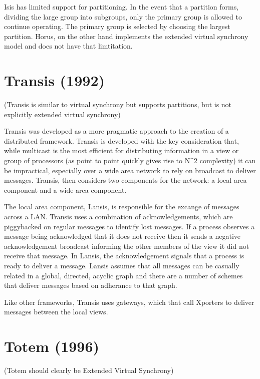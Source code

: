 Isis has limited support for partitioning. In the event that
a partition forms, dividing the large group into subgroups, only the primary
group is allowed to continue operating. The primary group is selected by
choosing the largest partition. Horus, on the other hand implements the extended
virtual synchrony model and does not have that limtitation.

\section{Transis (1992)}

(Transis is similar to virtual synchrony but supports partitions, but is not explicitly extended virtual synchrony)

Transis was developed as a more pragmatic approach to the creation of a distributed
framework. Transis is developed with the key consideration that, while multicast is
the most efficient for distributing information in a view or group of processors (as
point to point quickly gives rise to N^2 complexity) it can be impractical, especially
over a wide area network to rely on broadcast to deliver messages. Transis, then
considers two components for the network: a local area component and a wide area 
component.

The local area component, Lansis, is responsible for the excange of messages across a
LAN. Transis uses a combination of acknowledgements, which are piggybacked on regular
messages to identify lost messages. If a process observes a message being acknowledged
that it does not receive then it sends a negative acknowledgement broadcast informing
the other members of the view it did not receive that message. In Lansis, the 
acknowledgement signals that a process is ready to deliver a message. Lansis assumes
that all messages can be casually related in a global, directed, acyclic graph and
there are a number of schemes that deliver messages based on adherance to that graph.

Like other frameworks, Transis uses gateways, which that call Xporters to deliver
messages between the local views. 

\section{Totem (1996)}

(Totem should clearly be Extended Virtual Synchrony)

